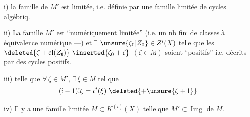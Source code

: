i) \deleted{$\unsure{\xi}$} la famille de $M'$ est limitée, i.e. définie par une famille limitée de \uline{cycles} algébriq.

ii) La famille  $M'$ est ``numériquement limitée'' (i.e. un nb fini de classes à équivalence numérique ---) et $\exists$   $\unsure{\zeta_0|Z_0}\in Z^i(X)$ telle que les $\deleted{\zeta+\operatorname{cl}(Z_0)}\ \inserted{\zeta_0+\zeta}$ $(\zeta\in M)$ soient ``positifs'' i.e. décrits par des cycles positifs.

iii)    telle que $\forall\,\zeta\in M'$, $\exists\,\xi\in M$ \uline{tel que}
\[
(i-1)!\zeta=c^i(\xi)\ \deleted{+\unsure{\zeta+1}}
\]

iv) Il y a une famille limitée $M\subset K^{(i)}(X)$ telle que $M'\subset\operatorname{Img}\text{ de }M$.

